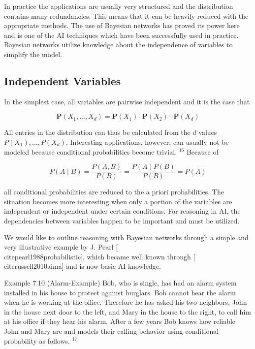 \documentclass[10pt]{book}
\begin{document}
In practice the applications are usually very structured and the distribution contains many redundancies. This means that it can be heavily reduced with the appropriate methods. The use of Bayesian networks has proved its power here and is one of the AI techniques which have been successfully used in practice. Bayesian networks utilize knowledge about the independence of variables to simplify the model.

\subsection{Independent Variables}
In the simplest case, all variables are pairwise independent and it is the case that

$$
\boldsymbol{P}\left(X_{1}, \ldots, X_{d}\right)=\boldsymbol{P}\left(X_{1}\right) \cdot \boldsymbol{P}\left(X_{2}\right) \cdots \boldsymbol{P}\left(X_{d}\right)
$$

All entries in the distribution can thus be calculated from the $d$ values $P\left(X_{1}\right), \ldots, P\left(X_{d}\right)$. Interesting applications, however, can usually not be modeled because conditional probabilities become trivial. ${ }^{16}$ Because of


$$
P(A \mid B)=\frac{P(A, B)}{P(B)}=\frac{P(A) P(B)}{P(B)}=P(A)
$$

all conditional probabilities are reduced to the a priori probabilities. The situation becomes more interesting when only a portion of the variables are independent or independent under certain conditions. For reasoning in AI, the dependencies between variables happen to be important and must be utilized.

We would like to outline reasoning with Bayesian networks through a simple and very illustrative example by J. Pearl [\\cite{pearl1988probabilistic}], which became well known through [\\cite{russell2010aima}] and is now basic AI knowledge.

Example 7.10 (Alarm-Example) Bob, who is single, has had an alarm system installed in his house to protect against burglars. Bob cannot hear the alarm when he is working at the office. Therefore he has asked his two neighbors, John in the house next door to the left, and Mary in the house to the right, to call him at his office if they hear his alarm. After a few years Bob knows how reliable John and Mary are and models their calling behavior using conditional probability as follows. ${ }^{17}$
\end{document}
